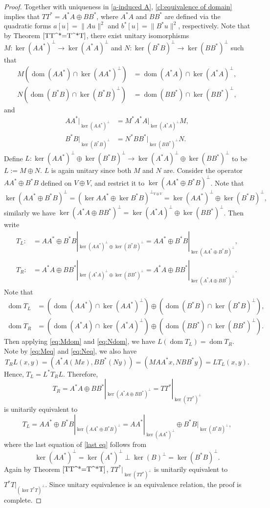 \documentclass[11pt]{article}
\theoremstyle{definition}
\theoremstyle{remark}
\DeclareMathOperator\dom{dom}
\begin{document}
\begin{proof}
Together with uniqueness in \cref{a-induced A}, \cref{cl:equivalence of domain} implies that $TT^*=A^*A\oplus BB^*$, where $A^*A$ and $BB^*$ are defined via the quadratic forms $a[u]=\|Au\|^2$ and $b^*[u]=\|B^*u\|^2$, respectively. Note that by Theorem $\ref{TT^*=T^*T}$, there exist unitary isomorphisms $M:\ker(AA^*)^\perp \to \ker(A^*A)^\perp$ and $N:\ker(B^*B)^\perp \to \ker(BB^*)^\perp$ such that
\begin{align}
    M\left(\dom(AA^*)\cap \ker(AA^*)^\perp\right)&=\dom(A^*A)\cap\ker(A^*A)^\perp,\label{eq:Mdom}\\
     N\left(\dom(B^*B)\cap \ker(B^*B)^\perp\right)&=\dom(BB^*)\cap\ker(BB^*)^\perp\label{eq:Ndom},
\end{align}
and
\begin{align}
    AA^*|_{\ker(AA^*)^\perp}&=M^*A^*A|_{\ker(A^*A)^\perp}M,\label{eq:Meq}\\
    B^*B|_{\ker(B^*B)^\perp}&=N^*BB^*|_{\ker(BB^*)^\perp}N.\label{eq:Neq}
\end{align}
Define $L:\ker(AA^*)^\perp\oplus\ker(B^*B)^\perp\to\ker(A^*A)^\perp\oplus\ker(BB^*)^\perp$ to be $L:=M\oplus N$. $L$ is again unitary since both $M$ and $N$ are. Consider the operator $AA^*\oplus B^*B$ defined on $V\oplus V$, and restrict it to $\ker(AA^*\oplus B^*B)^\perp$. Note that
$$\ker(AA^*\oplus B^*B)^{\perp}=(\ker AA^*\oplus \ker B^*B)^{\perp_{V\oplus V}}=\ker(AA^*)^\perp\oplus\ker(B^*B)^\perp,$$
similarly we have $\ker(A^*A\oplus BB^*)^\perp=\ker(A^*A)^\perp\oplus\ker(BB^*)^\perp$. Then write
\begin{align*}
    T_L:&=AA^*\oplus B^*B|_{\ker(AA^*)^\perp\oplus\ker(B^*B)^\perp}=AA^*\oplus B^*B|_{\ker(AA^*\oplus B^*B)^\perp},\\
T_R:&=A^*A\oplus BB^*|_{\ker(A^*A)^\perp\oplus\ker(BB^*)^\perp}=A^*A\oplus BB^*|_{\ker(A^*A\oplus BB^*)^\perp}.
\end{align*}
Note that 
\begin{align*}
    \dom T_L&=\left(\dom (AA^*)\cap \ker(AA^*)^\perp\right)\oplus\left(\dom(B^*B)\cap\ker(B^*B)^\perp\right),\\
    \dom T_R&=\left(\dom (A^*A)\cap \ker(A^*A)^\perp\right)\oplus\left(\dom(BB^*)\cap\ker(BB^*)^\perp\right).
\end{align*}
Then applying \eqref{eq:Mdom} and \eqref{eq:Ndom}, we have $L(\dom T_L)=\dom T_R$. Note by \eqref{eq:Meq} and \eqref{eq:Neq}, we also have
$$T_RL(x,y)=(A^*A(Mx),BB^*(Ny))=(MAA^*x,NBB^*y)=LT_L(x,y).$$
Hence, $T_L=L^*T_RL$. Therefore, 
$$T_R=A^*A\oplus BB^*|_{\ker(A^*A\oplus BB^*)^\perp}=TT^*|_{\ker(TT^*)^\perp}$$
is unitarily equivalent to
\begin{equation}\label{last eq}
    T_L=AA^*\oplus B^*B|_{\ker(AA^*\oplus B^*B)^\perp}=AA^*|_{\ker(AA^*)^\perp} \oplus B^*B|_{\ker(B^*B)^\perp},
\end{equation}
where the last equation of \eqref{last eq} follows from
$$
\ker(AA^*)^\perp =\ker(A^*)^\perp \perp \ker(B)^\perp = \ker(B^*B)^\perp.
$$
Again by Theorem $\ref{TT^*=T^*T}$, $TT^*|_{\ker(TT^*)^\perp}$ is unitarily equivalent to $T^*T|_{(\ker{T^*T})^\perp}$. Since unitary equivalence is an equivalence relation, the proof is complete.
\end{proof}
\end{document}
